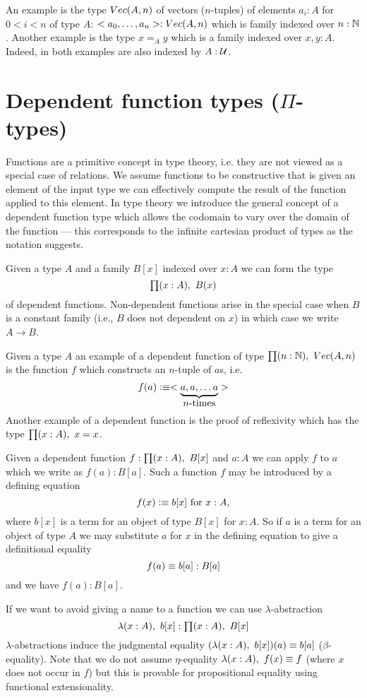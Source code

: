 {An example is the type $Vec(A,n)$ of
vectors ($n$-tuples) of elements $a_i : A$ for $0 < i< n$ of type $A$:
$<a_0,\dots,a_n> : Vec(A,n)$ which is family indexed
over $n : \mathbb{N}$. Another example is the type $x =_A y$ which is a
family indexed over $x,y : A$. Indeed, in both examples are also
indexed by $A:\mathcal{U}$.

\section{Dependent function types (\texorpdfstring{$\Pi$}{Π}-types)}
\label{sec:pi-types}

Functions are a primitive concept in type theory, i.e. they are not
viewed as a special case of relations. We assume functions to be
constructive that is given an element of the input type we can
effectively compute the result of the function applied to this
element. In type theory we introduce the general concept of a
dependent function type which allows the codomain to vary over the
domain of the function --- this corresponds to the infinite cartesian
product of types as the notation suggests. 

Given a type $A$
and a family $B[x]$ indexed over $x:A$ we can form the type
\[\prd{x:A}B(x)\] of dependent functions. Non-dependent functions arise
in the special case when $B$ is a constant family (i.e., $B$ does not
dependent on $x$) in which case we write $A \to B$.

Given a type $A$ an example of a dependent function of type
$\prd{n:\Nat}\Vect(A,n)$
is the function $f$ which constructs an $n$-tuple of $a$s, i.e. 
\[ f(a) \vcentcolon\equiv <\underbrace{a,a,\dots a}_{\mbox{$n$-times}}> \] %
 Another example
of a dependent function is the proof of reflexivity which has the type
$\prd{x:A}x = x$.

Given a dependent function $f : \prd{x:A}B[x]$ and $a : A$ we can
apply $f$ to $a$ which we write as $f(a) : B[a]$.  Such a function $f$ may be introduced by a defining equation
  \[ f(x)\vcentcolon\equiv b[x]\mbox{ for } x:A,\]
where $b[x]$ is a term for an object of type $B[x]$ for $x:A$. So if $a$ is a term for an object of type $A$ we may substitute $a$ for $x$ in the defining equation to give a definitional equality
  \[ f(a)\equiv b[a]:B[a]\]
and we have $f(a):B[a]$. 

If we want to avoid giving a name to a function we can use
$\lambda$-abstraction 
\[\lam{x:A}b[x] : \prd{x:A}B[x]\]
$\lambda$-abstractions induce the judgmental equality
$(\lam{x:A}b[x])(a) \jdeq b[a]$ ($\beta$-equality). Note that
we do not assume $\eta$-equality $\lam{x:A} f(x) \jdeq f$ (where
$x$ does not occur in $f$) but this is provable for propositional
equality using functional extensionality.

}
